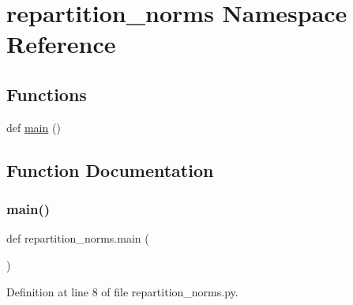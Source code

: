 \hypertarget{namespacerepartition__norms}{}\section{repartition\+\_\+norms Namespace Reference}
\label{namespacerepartition__norms}
\subsection*{Functions}
\begin{DoxyCompactItemize}
\item 
def \hyperlink{namespacerepartition__norms_a00e11606ecc98b8a41475b59b603123b}{main} ()
\end{DoxyCompactItemize}


\subsection{Function Documentation}
\mbox{\label{namespacerepartition__norms_a00e11606ecc98b8a41475b59b603123b}} 
\subsubsection{\texorpdfstring{main()}{main()}}
{\footnotesize\ttfamily def repartition\+\_\+norms.\+main (\begin{DoxyParamCaption}{ }\end{DoxyParamCaption})}



Definition at line 8 of file repartition\+\_\+norms.\+py.


